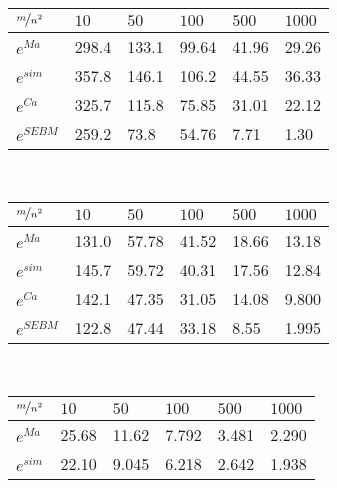 



\begin{table*}[]
    \centering 
    \begin{minipage}[]{0.8\textwidth}
        \centering
        \caption{Airport Game Average Errors}\label{tab1}
			\begin{tabular}{llllll}
			\hline
			$\nicefrac{m}{n^2}$ & $10$ & $50$ & $100$ & $500$ & $1000$ \\
			\hline
			$e^{Ma}$   & 298.4 & 133.1 & 99.64 & 41.96 & 29.26 \\
			$e^{sim}$  & 357.8 & 146.1 & 106.2 & 44.55 & 36.33 \\
			$e^{Ca}$   & 325.7 & 115.8 & 75.85 & 31.01 & 22.12 \\
			$e^{SEBM}$ & 259.2 & 73.8 & 54.76 & 7.71 & 1.30  \\
			\hline
			\end{tabular}
    \end{minipage}
	\\\vspace{4mm}
    \begin{minipage}[]{0.8\textwidth}
        \centering
        \caption{Voting Game Average Errors}\label{tab2}
			\begin{tabular}{llllll}
			\hline
			$\nicefrac{m}{n^2}$ & $10$ & $50$ & $100$ & $500$ & $1000$ \\
			\hline
			$e^{Ma}$    & 131.0 & 57.78 & 41.52 & 18.66 & 13.18 \\
			$e^{sim}$   & 145.7 & 59.72 & 40.31 & 17.56 & 12.84 \\
			$e^{Ca}$    & 142.1 & 47.35 & 31.05 & 14.08 & 9.800 \\
			$e^{SEBM}$  & 122.8 & 47.44 & 33.18 & 8.55 & 1.995  \\
			\hline
			\end{tabular}
    \end{minipage}
	\\\vspace{4mm}
    \begin{minipage}[]{0.8\textwidth}
        \centering
        \caption{Simple Reward Division Game average errors}\label{tab3}
			\begin{tabular}{llllll}
			\hline
			$\nicefrac{m}{n^2}$ & $10$ & $50$ & $100$ & $500$ & $1000$ \\
			\hline
			$e^{Ma}$    & 25.68 & 11.62 & 7.792 & 3.481 & 2.290 \\
			$e^{sim}$   & 22.10 & 9.045 & 6.218 & 2.642 & 1.938 \\

\end{tabular}
\end{minipage}
\end{table*}
